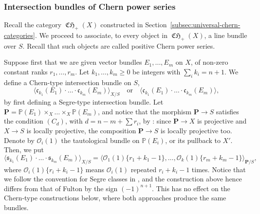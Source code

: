 \documentclass[11pt]{article}
\theoremstyle{plain}
\theoremstyle{definition}
\newcommand{\Pbold}{\mathbf{P}}
\newcommand{\PBbb}{\mathbb P}
\newcommand{\Ocal}{\mathcal O}
\newcommand{\cfrak}{\mathfrak c}
\newcommand{\sfrak}{\mathfrak s}
\DeclareMathOperator{\CHfrak}{\mathfrak{CH}}
\begin{document}
\subsubsection{Intersection bundles of Chern power series}
Recall the category $\CHfrak_{+}(X)$ constructed in Section~\ref{subsec:universal-chern-categories}. We proceed to associate, to every object in $\CHfrak_{+}(X)$, a line bundle over $S$. Recall that such objects are called positive Chern power series.

Suppose first that we are given vector bundles $E_1, \ldots, E_m$ on $X$, of non-zero constant ranks $r_1, \ldots, r_m$. Let $k_{1},\ldots,k_{m}\geq 0$ be integers with $\sum_{i}k_{i}=n+1$. We define a Chern-type intersection bundle on $S$,
\begin{equation}\label{eq:general-Chern-bundle-1}
\langle \cfrak_{k_{1}}(E_{1})\cdot\ldots \cdot \cfrak_{k_{m}}(E_{m})\rangle_{X/S}\quad\text{or}\quad \langle \cfrak_{k_{1}}(E_{1})\cdot\ldots \cdot \cfrak_{k_{m}}(E_{m})\rangle,
\end{equation}
by first defining a Segre-type intersection bundle. Let $\Pbold=\PBbb(E_{1})\times_{X}\ldots\times_{X}\PBbb(E_{m})$, and notice that the morphism $\Pbold\to S$ satisfies the condition $(C_{d})$, with $d=n-m+\sum r_{i}$, by \cite[\href{https://stacks.math.columbia.edu/tag/0C4P}{0C4P}]{stacks-project}: since $\Pbold\to X$ is projective and $X\to S$ is locally projective, the composition $\Pbold\to S$ is locally projective too. Denote by $\Ocal_i (1)$ the tautological bundle on $\PBbb (E_{i})$, or its pullback to $X'$. Then, we put\vspace*{-3pt}
\begin{equation}\label{eq:definition-Segre-classes}
\langle \sfrak_{k_1}(E_1)\cdot \ldots\cdot \sfrak_{k_{m}}(E_m) \rangle_{X/S} = \langle \Ocal_1 (1)\{r_1+k_1-1\}, \ldots, \Ocal_k (1)\{r_m+k_{m}-1\} \rangle_{\Pbold/S},
\end{equation}
where $\Ocal_i (1)\{r_i+k_i-1\}$ means $\Ocal_{i}(1)$ repeated $r_{i}+k_{i}-1$ times. Notice that we follow the convention for Segre classes in \cite{Elkikfib}, and the construction above hence differs from that of Fulton \cite{Fulton} by the sign $(-1)^{n+1}$. This has no effect on the Chern-type constructions below, where both approaches produce the same bundles.
\end{document}

